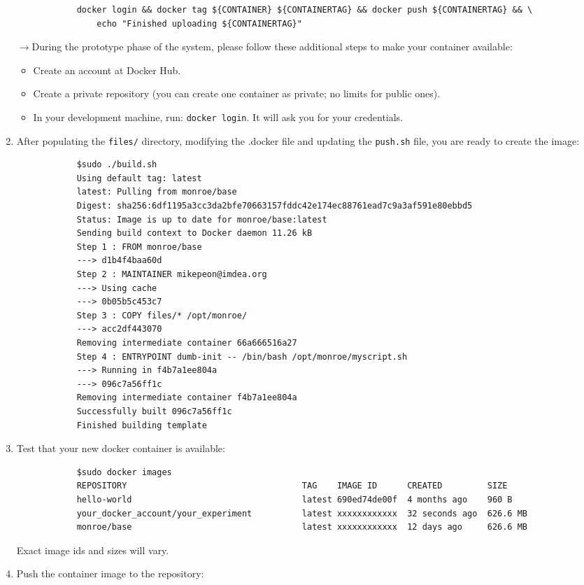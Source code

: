 \documentclass[a4paper,10pt]{article}
\newcommand{\VerbatimFont}{\footnotesize}
\newcommand{\identifier}[1]{{\texttt{\small{#1}}}}
\begin{document}
\begin{enumerate}
{\begin{verbatim}
			docker login && docker tag ${CONTAINER} ${CONTAINERTAG} && docker push ${CONTAINERTAG} && \
			    echo "Finished uploading ${CONTAINERTAG}"					
		\end{verbatim}}
		$\rightarrow$During the prototype phase of the system, please follow these additional steps to make your container available:
		\begin{itemize}
			\item Create an account at Docker Hub.
			\item Create a private repository (you can create one container as private; no limits for public ones).
			\item In your development machine, run: \identifier{docker login}. It will ask you for your credentials.
		\end{itemize}
	\item After populating the \identifier{files/} directory, modifying the .docker file and updating the \identifier{push.sh} file, you are ready to create the image:
		{\VerbatimFont\begin{verbatim}
			$sudo ./build.sh
			Using default tag: latest
			latest: Pulling from monroe/base
			Digest: sha256:6df1195a3cc3da2bfe70663157fddc42e174ec88761ead7c9a3af591e80ebbd5
			Status: Image is up to date for monroe/base:latest
			Sending build context to Docker daemon 11.26 kB
			Step 1 : FROM monroe/base
			---> d1b4f4baa60d
			Step 2 : MAINTAINER mikepeon@imdea.org
			---> Using cache
			---> 0b05b5c453c7
			Step 3 : COPY files/* /opt/monroe/
			---> acc2df443070
			Removing intermediate container 66a666516a27
			Step 4 : ENTRYPOINT dumb-init -- /bin/bash /opt/monroe/myscript.sh
			---> Running in f4b7a1ee804a
			---> 096c7a56ff1c
			Removing intermediate container f4b7a1ee804a
			Successfully built 096c7a56ff1c
			Finished building template
		\end{verbatim}}
	\item Test that your new docker container is available:
		{\VerbatimFont\begin{verbatim}
			$sudo docker images
			REPOSITORY                                   TAG    IMAGE ID      CREATED         SIZE
			hello-world                                  latest 690ed74de00f  4 months ago    960 B
			your_docker_account/your_experiment          latest xxxxxxxxxxxx  32 seconds ago  626.6 MB
			monroe/base                                  latest xxxxxxxxxxxx  12 days ago     626.6 MB
		\end{verbatim}}
		Exact image ids and sizes will vary.
	\item Push the container image to the repository:

\end{enumerate}
\end{document}
